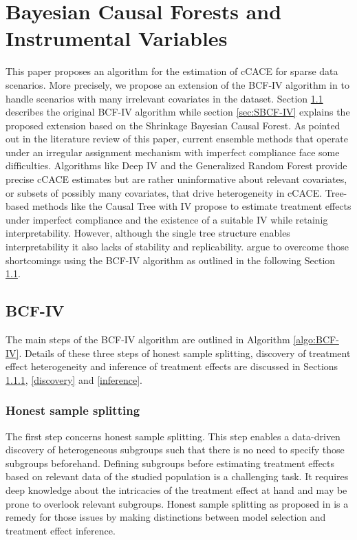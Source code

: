 \chapter{Bayesian Causal Forests and
Instrumental Variables}

This paper proposes an algorithm for the estimation of cCACE for sparse data scenarios. 
More precisely, we propose an extension of the BCF-IV algorithm in \cite{bargagli-stoffi_heterogeneous_2022} 
to handle scenarios with many irrelevant covariates in the dataset.
Section \ref{sec:BCF-IV} describes the original BCF-IV algorithm while section
\ref{sec:SBCF-IV} explains the proposed extension based on the Shrinkage Bayesian Causal Forest. As pointed out in the literature review of this paper, current ensemble methods that operate under an irregular assignment mechanism with imperfect compliance face some difficulties. Algorithms like Deep IV \cite{hartford_deep_2017} and the Generalized Random Forest \cite{athey_generalized_2019} provide precise cCACE estimates but are rather uninformative about relevant covariates, or subsets of possibly many covariates, that drive heterogeneity in cCACE. Tree-based methods like the Causal Tree with IV \cite{bargagli_stoffi_causal_2020} propose to estimate treatment effects under imperfect compliance and the existence of a suitable IV while retainig interpretability. However, although the single tree structure enables interpretability it also lacks of stability and replicability. \cite{bargagli-stoffi_heterogeneous_2022} argue to overcome those shortcomings using the BCF-IV algorithm as outlined in the following Section \ref{sec:BCF-IV}.   


\section{BCF-IV}
\label{sec:BCF-IV}

The main steps of the BCF-IV algorithm are outlined in Algorithm \ref{algo:BCF-IV}. Details of these three steps of honest sample splitting, discovery of treatment effect heterogeneity and inference of treatment effects are discussed in Sections \ref{honest_splitting}, \ref{discovery} and \ref{inference}.

\subsection{Honest sample splitting}
\label{honest_splitting}
The first step concerns honest sample splitting. This step enables a data-driven discovery of heterogeneous subgroups such that there is no need to specify those subgroups beforehand. Defining subgroups before estimating treatment effects based on relevant data of the studied population is a challenging task. It requires deep knowledge about the intricacies of the treatment effect at hand and may be prone to overlook relevant subgroups. Honest sample splitting as proposed in \cite{Athey_imbens_2016} is a remedy for those issues by making distinctions between model selection and treatment effect inference.    

